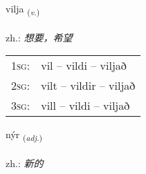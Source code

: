 \documentclass[frontgrid, backgrid]{flacards}\usepackage[]{graphicx}\usepackage[]{xcolor}
\begin{document}
\renewcommand{\blhead}{\vskip5pt {\small\bfseries\footnotesize Sagnorð | 动词 }}
\renewcommand{\bcfoot}{\vskip5pt \hspace{2pt}{\small\bfseries\footnotesize 1K}}


{vilja \small{\textsubscript{(\textit{v.})}} \\[1ex] %
\textphonetic{[vɪlja]} \\
zh.: \emph{想要，希望} \\  [2ex]
\renewcommand*{\arraystretch}{0.8}
\begin{tabular}{p{1cm}l}
\textsc{1sg}: & vil -- vildi -- viljað \\ 
\textsc{2sg}: & vilt -- vildir -- viljað \\ 
\textsc{3sg}: & vill -- vildi -- viljað \\ 
\end{tabular}
}

\renewcommand{\flhead}{\vskip5pt \fboxsep=0pt {\small\bfseries\footnotesize Lýsingarorð | 形容词}}
\renewcommand{\fcfoot}{\vskip5pt \fboxsep=0pt \hspace{2pt}{\small\bfseries\footnotesize 1K}}

\renewcommand{\blhead}{\vskip5pt {\small\bfseries\footnotesize Lýsingarorð | 形容词 }}
\renewcommand{\bcfoot}{\vskip5pt \hspace{2pt}{\small\bfseries\footnotesize 1K}}


{nýr \small{\textsubscript{(\textit{adj.})}} \\[1ex] %
\textphonetic{[niːr]} \\
zh.: \emph{新的} \\  [2ex]
\renewcommand*{\arraystretch}{0.8}
}
\end{document}
